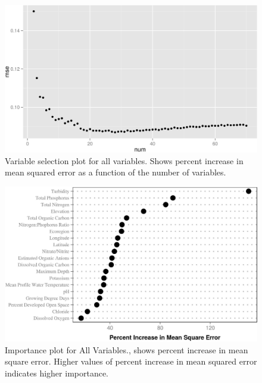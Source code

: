 \documentclass[11pt,]{article}
\begin{document}
\begin{figure}[htbp]
\centering
\includegraphics{manuscript_files/figure-latex/all_var_sel_figure-1.jpeg}
\caption{Variable selection plot for all variables. Shows percent
increase in mean squared error as a function of the number of variables.
\label{fig:all_varsel_figure}}
\end{figure}

\newpage

\begin{figure}[htbp]
\centering
\includegraphics{manuscript_files/figure-latex/All_Importance-1.jpeg}
\caption{Importance plot for All Variables., shows percent increase in
mean square error. Higher values of percent increase in mean squared
error indicates higher importance. \label{fig:All_Importance}}
\end{figure}

\newpage
\end{document}
